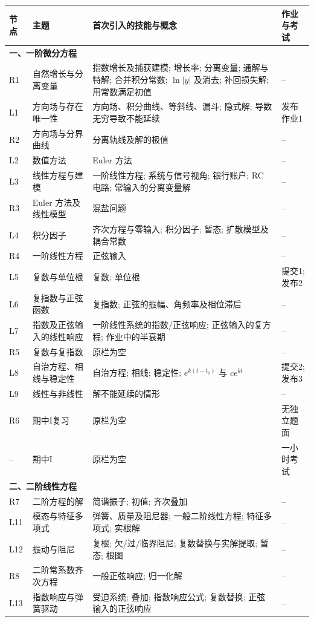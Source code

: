 \begin{longtable}{p{}p{}p{}p{}}
\toprule 节点 & 主题 & 首次引入的技能与概念 & 作业与考试 \\\midrule\endhead
\multicolumn{4}{l}{\textbf{一、一阶微分方程}}\\
R1 & 自然增长与分离变量 & 指数增长及捕获建模; 增长率; 分离变量; 通解与特解; 合并积分常数; $\ln|y|$ 及消去; 补回损失解; 用常数满足初值 & -- \\
L1 & 方向场与存在唯一性 & 方向场、积分曲线、等斜线、漏斗; 隐式解; 导数无穷导致不能延续 & 发布作业1 \\
R2 & 方向场与分界曲线 & 分离轨线及解的极值 & -- \\
L2 & 数值方法 & Euler 方法 & -- \\
L3 & 线性方程与建模 & 一阶线性方程; 系统与信号视角; 银行账户; RC 电路; 常输入的分离变量解 & -- \\
R3 & Euler 方法及线性模型 & 混盐问题 & -- \\
L4 & 积分因子 & 齐次方程与零输入; 积分因子; 暂态; 扩散模型及耦合常数 & -- \\
R4 & 一阶线性方程 & 正弦输入 & -- \\
L5 & 复数与单位根 & 复数; 单位根 & 提交1; 发布2 \\
L6 & 复指数与正弦函数 & 复指数; 正弦的振幅、角频率及相位滞后 & -- \\
L7 & 指数及正弦输入的线性响应 & 一阶线性系统的指数/正弦响应; 正弦输入的复方程; 作业中的半衰期 & -- \\
R5 & 复数与复指数 & 原栏为空 & -- \\
L8 & 自治方程、相线与稳定性 & 自治方程; 相线; 稳定性; $e^{k(t-t_0)}$ 与 $ce^{kt}$ & 提交2; 发布3 \\
L9 & 线性与非线性 & 解不能延续的情形 & -- \\
R6 & 期中I复习 & 原栏为空 & 无独立题面 \\
-- & 期中I & 原栏为空 & 一小时考试 \\
\multicolumn{4}{l}{\textbf{二、二阶线性方程}}\\
R7 & 二阶方程的解 & 简谐振子; 初值; 齐次叠加 & -- \\
L11 & 模态与特征多项式 & 弹簧、质量及阻尼器; 一般二阶线性方程; 特征多项式; 实根解 & -- \\
L12 & 振动与阻尼 & 复根; 欠/过/临界阻尼; 复数替换与实解提取; 暂态; 根图 & -- \\
R8 & 二阶常系数齐次方程 & 一般正弦响应; 归一化解 & -- \\
L13 & 指数响应与弹簧驱动 & 受迫系统; 叠加; 指数响应公式; 复数替换; 正弦输入的正弦响应 & -- \\

\end{longtable}
